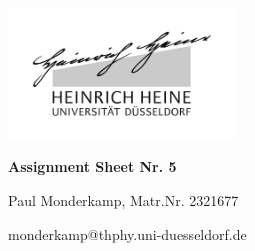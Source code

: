 \documentclass[12pt,a4paper]{article}	%
\begin{document}

\setlength{\parindent}{0pt}


\thispagestyle{empty}

\begin{titlepage}
	\centering
	\includegraphics[width=0.45\textwidth]{logo_sw.jpg}\par\vspace{1cm}
	\vspace{1cm}
	\vspace{1.5cm}
	{\LARGE\bfseries Assignment Sheet Nr. 5\\  \par}
	\vspace{1cm}
	
	{\large	Paul Monderkamp, Matr.Nr. 2321677\par}
	\vfill
	

	\vfill

	{\large  monderkamp@thphy.uni-duesseldorf.de \par}
	\vspace{2cm}
\end{titlepage}

\thispagestyle{empty} %
\newpage	%
\end{document}
